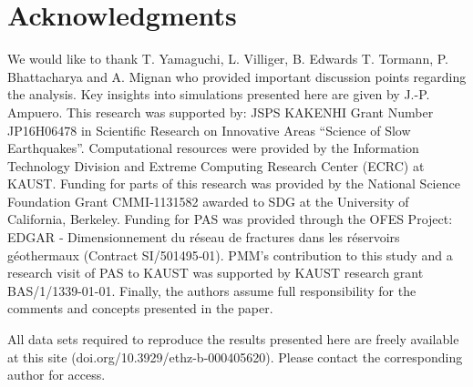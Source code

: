 \documentclass[preprint,1p, 10pt,authoryear]{elsarticle}
\begin{document}
\section*{Acknowledgments}
We would like to thank T. Yamaguchi, L. Villiger, B. Edwards T. Tormann, P. Bhattacharya and A. Mignan who provided important discussion points regarding the analysis. Key insights into simulations presented here are given by J.-P. Ampuero. This research was supported by: JSPS KAKENHI Grant Number JP16H06478 in Scientific Research on Innovative Areas ``Science of Slow Earthquakes''. Computational resources were provided by the Information Technology Division and Extreme Computing Research Center (ECRC) at KAUST. Funding for parts of this research was provided by the National Science Foundation Grant CMMI‐1131582 awarded to SDG at the University of California, Berkeley. Funding for PAS was provided through the OFES Project: EDGAR ‐ Dimensionnement du réseau de fractures dans les réservoirs géothermaux (Contract SI/501495‐01). PMM's contribution to this study and a research visit of PAS to KAUST was supported by KAUST research grant BAS/1/1339-01-01. Finally, the authors assume full responsibility for the comments and concepts presented in the paper.

All data sets required to reproduce the results presented here are freely available at this site (doi.org/10.3929/ethz-b-000405620). Please contact the corresponding author for access.

\singlespacing

 

\end{document}
